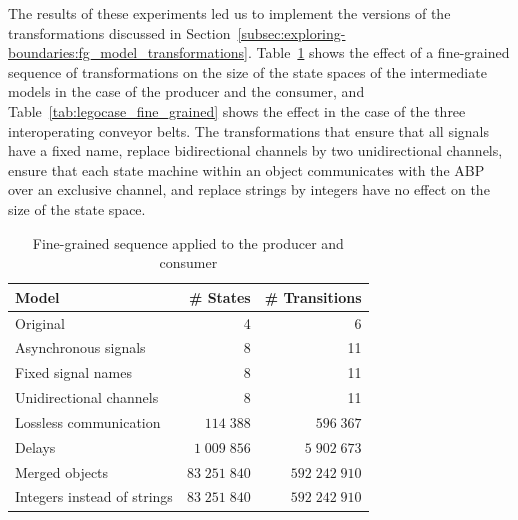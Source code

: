 The results of these experiments led us to implement the versions of the transformations discussed in Section~\ref{subsec:exploring-boundaries:fg_model_transformations}.
Table~\ref{tab:simple_fine_grained} shows the effect of a fine-grained sequence of transformations on the size of the state spaces of the intermediate models in the case of the producer and the consumer, and Table~\ref{tab:legocase_fine_grained} shows the effect in the case of the three interoperating conveyor belts.
The transformations that ensure that all signals have a fixed name, replace bidirectional channels by two unidirectional channels, ensure that each state machine within an object communicates with the ABP over an exclusive channel, and replace strings by integers have no effect on the size of the state space.


\begin{table}[hbt]
\centering
\small
\begin{tabular}{|l|r|r|}
\hline
\rowcolor[gray]{.9}
 \textbf{Model}              & \textbf{\# States} & \textbf{\# Transitions} \\
\hline
 Original                    & 4                  & 6 \\
\hline
 Asynchronous signals        & 8                  & 11 \\
\hline
 Fixed signal names          & 8                  & 11 \\
\hline
 Unidirectional channels     & 8                  & 11 \\
\hline
 Lossless communication      & $114\;388$         & $596\;367$ \\
\hline
 Delays                      & $1\;009\;856$      & $5\;902\;673$ \\
\hline
 Merged objects              & $83\;251\;840$     & $592\;242\;910$ \\
\hline
 Integers instead of strings & $83\;251\;840$     & $592\;242\;910$ \\
\hline
\end{tabular}
\caption{Fine-grained sequence applied to the producer and consumer}
\label{tab:simple_fine_grained}
\end{table}

